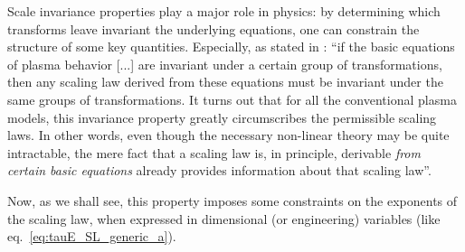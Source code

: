 Scale invariance properties play a major role in physics: by determining which transforms leave invariant the underlying equations, one can constrain the structure of some key quantities. Especially, as stated in \cite{Connor1977}: ``if the basic equations of plasma behavior [...] are invariant under a certain group of transformations, then any scaling law derived from these equations must be invariant under the same groups of transformations. It turns out that for all the conventional plasma models, this invariance property greatly circumscribes the permissible scaling laws. In other words, even though the necessary non-linear theory may be quite intractable, the mere fact that a scaling law is, in principle, derivable \emph{from certain basic equations} already provides information about that scaling law''.

Now, as we shall see, this property imposes some constraints on the exponents of the scaling law, when expressed in dimensional (or engineering) variables (like eq.~\ref{eq:tauE_SL_generic_a}). \\

